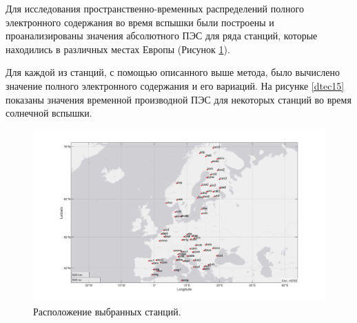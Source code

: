 \documentclass[a4paper]{article}
\begin{document}
Для исследования пространственно-временных распределений полного электронного содержания во время вспышки были построены и проанализированы значения абсолютного  ПЭС для ряда станций, которые находились в различных местах Европы (Рисунок \ref{stations}).

Для каждой из станций, с помощью описанного выше метода, было вычислено значение полного электронного содержания и его вариаций. На рисунке \ref{dtec15} показаны значения временной производной ПЭС для некоторых станций во время солнечной вспышки.

\begin{landscape}
\begin{figure}[h!]
\centering
\includegraphics[width = 1\linewidth]{pics/clean_pics/stations.png}
\caption{Расположение выбранных станций.}
\label{stations}
\end{figure}
\end{landscape}
\end{document}
